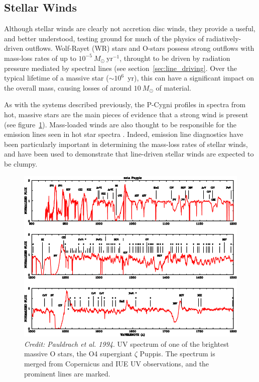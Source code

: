 \subsection{Stellar Winds}

\label{sec:stellar_winds}

Although stellar winds are clearly not accretion disc winds,
they provide a useful, and better understood, testing ground for much
of the physics of radiatively-driven outflows. 
Wolf-Rayet (WR) stars and O-stars possess strong outflows with mass-loss rates
of up to $10^{-5}~M_\odot~$yr$^{-1}$, throught to be driven by radiation pressure
mediated by spectral lines (see section~\ref{sec:line_driving}. 
Over the typical lifetime of a massive
star ($\sim10^6$~yr), this can have a significant impact on the overall mass,
causing losses of around $10~M_\odot$ of material. 

As with the systems described previously, the P-Cygni profiles
in spectra from hot, massive stars are the main pieces of evidence that
a strong wind is present (see figure~\ref{fig:hot_star_wind}). Mass-loaded
winds are also thought to be responsible for the emission lines 
seen in hot star spectra \citep[e.g.][]{pauldrach1994}. Indeed, emission
line diagnostics have been particularly important in determining
the mass-loss rates of stellar winds, and have been used to demonstrate 
that line-driven stellar winds are expected to be clumpy. 

\begin{figure}
\centering
\includegraphics[width=1.0\textwidth]{figures/02-outflows/hot_star_wind.png}
\caption
{
{\sl Credit: Pauldrach et al. 1994}. 
UV spectrum of one of the brightest massive O stars, 
the O4 supergiant $\zeta$ Puppis. The spectrum is merged from 
Copernicus and IUE UV observations, and the prominent lines are 
marked.
} 
\label{fig:hot_star_wind}
\end{figure}

